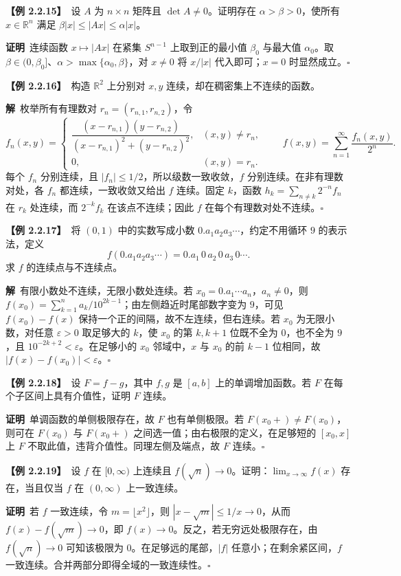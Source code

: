 \documentclass[UTF8,a4paper,11pt]{ctexart}
\newcommand{\ex}[1]{\par\medskip\noindent\textbf{【例 #1】}\ }
\newcommand{\pf}{\par\noindent\textbf{证明}\ }
\newcommand{\sol}{\par\noindent\textbf{解}\ }
\begin{document}
\ex{2.2.15}设 $A$ 为 $n\times n$ 矩阵且 $\det A\ne0$。证明存在 $\alpha>\beta>0$，使所有 $x\in\mathbb R^n$ 满足 $\beta|x|\le|Ax|\le\alpha|x|$。
\pf 连续函数 $x\mapsto|Ax|$ 在紧集 $S^{n-1}$ 上取到正的最小值 $\beta_0$ 与最大值 $\alpha_0$。取 $\beta\in(0,\beta_0]$、$\alpha>\max\{\alpha_0,\beta\}$，对 $x\ne0$ 将 $x/|x|$ 代入即可；$x=0$ 时显然成立。\hfill$\square$

\ex{2.2.16}构造 $\mathbb R^2$ 上分别对 $x,y$ 连续，却在稠密集上不连续的函数。
\sol 枚举所有有理数对 $r_n=(r_{n,1},r_{n,2})$，令
\[
f_n(x,y)=\begin{cases}
\dfrac{(x-r_{n,1})(y-r_{n,2})}{(x-r_{n,1})^2+(y-r_{n,2})^2},&(x,y)\ne r_n,\\[3pt]
0,&(x,y)=r_n.
\end{cases}
\qquad f(x,y)=\sum_{n=1}^{\infty}\frac{f_n(x,y)}{2^n}.
\]
每个 $f_n$ 分别连续，且 $|f_n|\le1/2$，所以级数一致收敛，$f$ 分别连续。在非有理数对处，各 $f_n$ 都连续，一致收敛又给出 $f$ 连续。固定 $k$，函数 $h_k=\sum_{n\ne k}2^{-n}f_n$ 在 $r_k$ 处连续，而 $2^{-k}f_k$ 在该点不连续；因此 $f$ 在每个有理数对处不连续。\hfill$\square$

\ex{2.2.17}将 $(0,1)$ 中的实数写成小数 $0.a_1a_2a_3\cdots$，约定不用循环 $9$ 的表示法，定义
\[
f(0.a_1a_2a_3\cdots)=0.a_1\,0\,a_2\,0\,a_3\,0\cdots.
\]
求 $f$ 的连续点与不连续点。
\sol 有限小数处不连续，无限小数处连续。若 $x_0=0.a_1\cdots a_n$，$a_n\ne0$，则 $f(x_0)=\sum_{k=1}^n a_k/10^{2k-1}$；由左侧趋近时尾部数字变为 $9$，可见 $f(x_0)-f(x)$ 保持一个正的间隔，故不左连续，但右连续。若 $x_0$ 为无限小数，对任意 $\varepsilon>0$ 取足够大的 $k$，使 $x_0$ 的第 $k,k+1$ 位既不全为 $0$，也不全为 $9$，且 $10^{-2k+2}<\varepsilon$。在足够小的 $x_0$ 邻域中，$x$ 与 $x_0$ 的前 $k-1$ 位相同，故 $|f(x)-f(x_0)|<\varepsilon$。\hfill$\square$

\ex{2.2.18}设 $F=f-g$，其中 $f,g$ 是 $[a,b]$ 上的单调增加函数。若 $F$ 在每个子区间上具有介值性，证明 $F$ 连续。
\pf 单调函数的单侧极限存在，故 $F$ 也有单侧极限。若 $F(x_0+)\ne F(x_0)$，则可在 $F(x_0)$ 与 $F(x_0+)$ 之间选一值；由右极限的定义，在足够短的 $[x_0,x]$ 上 $F$ 不取此值，违背介值性。同理左侧及端点，故 $F$ 连续。\hfill$\square$

\ex{2.2.19}设 $f$ 在 $[0,\infty)$ 上连续且 $f(\sqrt n)\to0$。证明：$\lim_{x\to\infty}f(x)$ 存在，当且仅当 $f$ 在 $(0,\infty)$ 上一致连续。
\pf 若 $f$ 一致连续，令 $m=\lfloor x^2\rfloor$，则 $|x-\sqrt m|\le1/x\to0$，从而 $f(x)-f(\sqrt m)\to0$，即 $f(x)\to0$。反之，若无穷远处极限存在，由 $f(\sqrt n)\to0$ 可知该极限为 $0$。在足够远的尾部，$|f|$ 任意小；在剩余紧区间，$f$ 一致连续。合并两部分即得全域的一致连续性。\hfill$\square$
\end{document}
